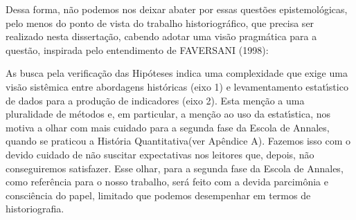 \documentclass[
12pt,		%
openright,	%
twoside,  %
a4paper,			%
chapter=TITLE,		%
english,			%
french,				%
spanish,			%
brazil				%
]{USPSC-classe/USPSC}
\begin{document}
Dessa forma, n\~ao podemos nos deixar abater por essas quest\~oes epistemol\'ogicas, pelo menos do ponto de vista do trabalho historiogr\'afico, que precisa ser realizado nesta disserta\c{c}\~ao, cabendo adotar uma vis\~ao pragm\'atica para a quest\~ao, inspirada pelo entendimento de FAVERSANI (1998):


















\noindent\begin{center}\mbox{\centering{}}\end{center}


As busca pela verifica\c{c}\~ao das Hip\'oteses indica uma complexidade que exige uma vis\~ao sist\^emica entre abordagens hist\'oricas (eixo 1) e levamentamento estat\'{\i}stico de dados para a produ\c{c}\~ao de indicadores (eixo 2). Esta men\c{c}\~ao a uma pluralidade de m\'etodos e, em particular, a men\c{c}\~ao ao uso da estat\'{\i}stica, nos motiva a olhar com mais cuidado para a segunda fase da Escola de Annales, quando se praticou a \textquotedbl Hist\'oria Quantitativa\textquotedbl  (ver Ap\^endice A). Fazemos isso com o devido cuidado de n\~ao suscitar expectativas nos leitores que, depois, n\~ao conseguiremos satisfazer. Esse olhar, para a segunda fase da Escola de Annales, como refer\^encia para o nosso trabalho, ser\'a feito com a devida parcim\^onia e consci\^encia do papel, limitado que podemos desempenhar em termos de historiografia.
\end{document}
